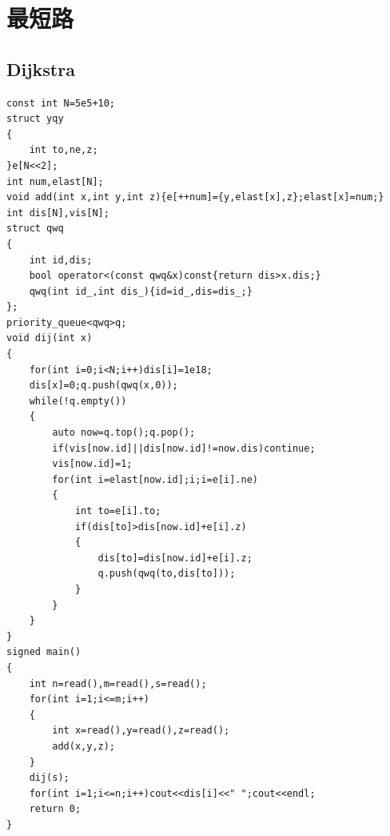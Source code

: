 \section{最短路}

\subsection{Dijkstra}

\begin{verbatim}
const int N=5e5+10;
struct yqy
{
    int to,ne,z;
}e[N<<2];
int num,elast[N];
void add(int x,int y,int z){e[++num]={y,elast[x],z};elast[x]=num;}
int dis[N],vis[N];
struct qwq
{
    int id,dis;
    bool operator<(const qwq&x)const{return dis>x.dis;}
    qwq(int id_,int dis_){id=id_,dis=dis_;}
};
priority_queue<qwq>q;
void dij(int x)
{
    for(int i=0;i<N;i++)dis[i]=1e18;
    dis[x]=0;q.push(qwq(x,0));
    while(!q.empty())
    {
        auto now=q.top();q.pop();
        if(vis[now.id]||dis[now.id]!=now.dis)continue;
        vis[now.id]=1;
        for(int i=elast[now.id];i;i=e[i].ne)
        {
            int to=e[i].to;
            if(dis[to]>dis[now.id]+e[i].z)
            {
                dis[to]=dis[now.id]+e[i].z;
                q.push(qwq(to,dis[to]));
            }
        }
    }
}
signed main()
{
    int n=read(),m=read(),s=read();
    for(int i=1;i<=m;i++)
    {
        int x=read(),y=read(),z=read();
        add(x,y,z);
    }
    dij(s);
    for(int i=1;i<=n;i++)cout<<dis[i]<<" ";cout<<endl;
    return 0;
}
\end{verbatim}

